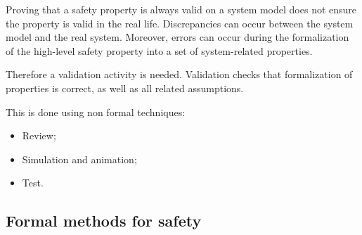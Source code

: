 Proving that a safety property is always valid on a system model does
not ensure the property is valid in the real life. Discrepancies can
occur between the system model and the real system. Moreover, errors
can occur during the formalization of the high-level safety property
into a set of system-related properties.

Therefore a validation activity is needed. Validation checks that
formalization of properties is correct, as well as all related
assumptions.

This is done using non formal techniques:
\begin{itemize}
\item Review;
\item Simulation and animation;
\item Test.
\end{itemize}

\subsection{Formal methods for safety}

\begin{comment}
proof of safety requirements, static analysis, safety analysis, traceability,...
\end{comment}




